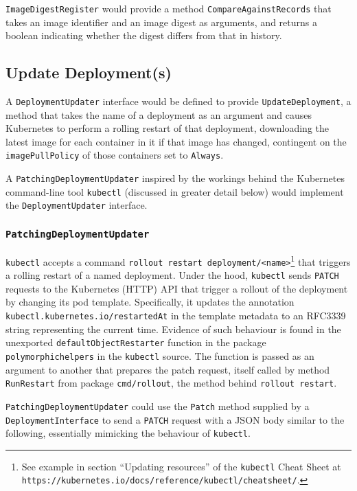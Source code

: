 \documentclass{article}
\begin{document}
\texttt{ImageDigestRegister} would provide a method
\texttt{CompareAgainstRecords}
that takes an image identifier and an image digest as arguments, and
returns a boolean indicating whether the digest differs from that in history.

\subsection{Update Deployment(s)}
A \texttt{DeploymentUpdater} interface would be defined
to provide \texttt{UpdateDeployment}, a method
that takes the name of a deployment as an argument and
causes Kubernetes to perform a rolling restart of that deployment,
downloading the latest image for each container in it if that image has changed,
contingent on the \texttt{imagePullPolicy} of those containers
set to \texttt{Always}.

A \texttt{PatchingDeploymentUpdater}
inspired by the workings behind the Kubernetes command-line tool
\texttt{kubectl} (discussed in greater detail below)
would implement the \texttt{DeploymentUpdater} interface.

\subsubsection{\texttt{PatchingDeploymentUpdater}}
\texttt{kubectl} accepts a command
\texttt{rollout restart deployment/<name>}\footnote{
    See example in section ``Updating resources'' of
    the \texttt{kubectl} Cheat Sheet
    at \texttt{https://kubernetes.io/docs/reference/kubectl/cheatsheet/}.
}
that triggers a rolling restart of a named deployment.
Under the hood, \texttt{kubectl} sends \texttt{PATCH} requests
to the Kubernetes (HTTP) API
that trigger a rollout of the deployment
by changing its pod template.
Specifically, it
updates the annotation \texttt{kubectl.kubernetes.io/restartedAt}
in the template metadata to an RFC3339 string representing the current time.
Evidence of such behaviour is found
in the unexported \texttt{defaultObjectRestarter} function
in the package \texttt{polymorphichelpers} in the \texttt{kubectl} source.
The function is passed as an argument
to another that prepares the patch request,
itself called by method \texttt{RunRestart} from package \texttt{cmd/rollout},
the method behind \texttt{rollout restart}.

\texttt{PatchingDeploymentUpdater} could use the \texttt{Patch} method
supplied by a \texttt{DeploymentInterface}
to send a \texttt{PATCH} request with a JSON body similar to the following,
essentially mimicking the behaviour of \texttt{kubectl}.
\end{document}
